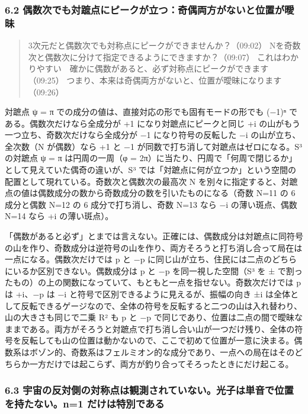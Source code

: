 \documentclass[
  a4paper,
]{ltjsarticle}
\begin{document}
\subsubsection{6.2
偶数次でも対蹠点にピークが立つ：奇偶両方がないと位置が曖昧}\label{ux5076ux6570ux6b21ux3067ux3082ux5bfeux8e60ux70b9ux306bux30d4ux30fcux30afux304cux7acbux3064ux5947ux5076ux4e21ux65b9ux304cux306aux3044ux3068ux4f4dux7f6eux304cux66d6ux6627}

\begin{quote}
3次元だと偶数次でも対称点にピークができませんか？（09:02）
Nを奇数次と偶数次に分けて指定できるようにできますか？（09:07）
これはわかりやすい　確かに偶数があると、必ず対称点にピークができます（09:25）
つまり、本来は奇偶両方がないと、位置が曖昧になります（09:26）
\end{quote}

対蹠点 ψ = π での成分の値は、直接対応の形でも固有モードの形でも (−1)ⁿ
である。偶数次だけなら全成分が +1 になり対蹠点にピークと同じ +i
の山がもう一つ立ち、奇数次だけなら全成分が −1 になり符号の反転した −i
の山が立ち、全次数（N が偶数）なら +1 と −1
が同数で打ち消して対蹠点はゼロになる。S³ の対蹠点 ψ = π は円周の一周（φ
= 2π）に当たり、円周で「何周で閉じるか」として見えていた偶奇の違いが、S³
では「対蹠点に何が立つか」という空間の配置として現れている。奇数次と偶数次の最高次
N
を別々に指定すると、対蹠点の値は偶数成分の数から奇数成分の数を引いたものになる（奇数
N=11 の 6 成分と偶数 N=12 の 6 成分で打ち消し、奇数 N=13 なら −i
の薄い斑点、偶数 N=14 なら +i の薄い斑点）。

「偶数があると必ず」とまでは言えない。正確には、偶数成分は対蹠点に同符号の山を作り、奇数成分は逆符号の山を作り、両方そろうと打ち消し合って局在は一点になる。偶数次だけでは
p と −p
に同じ山が立ち、住民には二点のどちらにいるか区別できない。偶数成分は p
と −p を同一視した空間（S³ を ±
で割ったもの）の上の関数になっていて、もともと一点を指せない。奇数次だけでは
p は +i、−p は −i と符号で区別できるように見えるが、振幅の向き ±i
は全体として反転できるゲージなので、全体の符号を反転すると二つの山は入れ替わり、山の大きさも同じで二乗
R² も p と −p
で同じであり、位置は二点の間で曖昧なままである。両方がそろうと対蹠点で打ち消し合い山が一つだけ残り、全体の符号を反転しても山の位置は動かないので、ここで初めて位置が一意に決まる。偶数系はボゾン的、奇数系はフェルミオン的な成分であり、一点への局在はそのどちらか一方だけでは起こらず、両方が釣り合ってそろったときにだけ起こる。

\subsubsection{6.3
宇宙の反対側の対称点は観測されていない。光子は単音で位置を持たない。n=1
だけは特別である}\label{ux5b87ux5b99ux306eux53cdux5bfeux5074ux306eux5bfeux79f0ux70b9ux306fux89b3ux6e2cux3055ux308cux3066ux3044ux306aux3044ux5149ux5b50ux306fux5358ux97f3ux3067ux4f4dux7f6eux3092ux6301ux305fux306aux3044n1-ux3060ux3051ux306fux7279ux5225ux3067ux3042ux308b}
\end{document}
